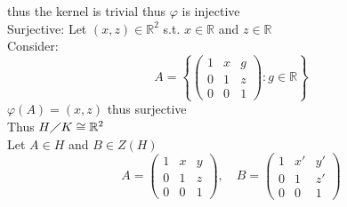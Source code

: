 \documentclass[12pt, letterpaper]{article}
\theoremstyle{definition}
\newcommand{\R}{\mathbb{R}}
\begin{document}
    thus the kernel is trivial thus $\varphi$ is injective\\
    Surjective: Let $(x,z) \in \R^2$ s.t. $x \in \R$ and $z \in \R$\\
    Consider: 
    \[
    A = \left\{ 
        \begin{pmatrix}
        1 & x & g \\
        0 & 1 & z \\
        0 & 0 & 1
        \end{pmatrix}  : g \in \mathbb{R} \right\}
    \]
    $\varphi(A)=(x,z)$ thus surjective\\
    Thus $H \diagup K \cong \R^2$\\
    Let $A \in H$ and $B \in Z(H)$
    \[
    A = \begin{pmatrix}
    1 & x & y \\
    0 & 1 & z \\
    0 & 0 & 1
    \end{pmatrix}, \quad
    B = \begin{pmatrix}
    1 & x' & y' \\
    0 & 1 & z' \\
    0 & 0 & 1
    \end{pmatrix}
    \]
        
\end{document}
